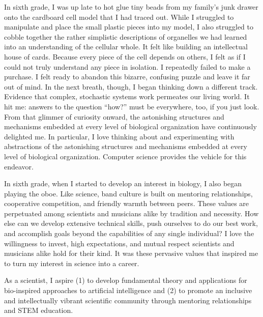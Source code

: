 In sixth grade, I was up late to hot glue tiny beads from my family's junk drawer onto the cardboard cell model that I had traced out.
While I struggled to manipulate and place the small plastic pieces into my model, I also struggled to cobble together the rather simplistic descriptions of organelles we had learned into an understanding of the cellular whole.
It felt like building an intellectual house of cards.
Because every piece of the cell depends on others, I felt as if I could not truly understand any piece in isolation.
I repeatedly failed to make a purchase.
I felt ready to abandon this bizarre, confusing puzzle and leave it far out of mind.
In the next breath, though, I began thinking down a different track.
Evidence that complex, stochastic systems work permeates our living world.
It hit me: answers to the question ``how?'' must be everywhere, too, if you just look.
From that glimmer of curiosity onward, the astonishing structures and mechanisms embedded at every level of biological organization have continuously delighted me.
In particular, I love thinking about and experimenting with abstractions of the astonishing structures and mechanisms embedded at every level of biological organization.
Computer science provides the vehicle for this endeavor.

In sixth grade, when I started to develop an interest in biology, I also began playing the oboe.
Like science, band culture is built on mentoring relationships, cooperative competition, and friendly warmth between peers.
These values are perpetuated among scientists and musicians alike by tradition and necessity.
How else can we develop extensive technical skills, push ourselves to do our best work, and accomplish goals beyond the capabilities of any single individual?
I love the willingness to invest, high expectations, and mutual respect scientists and musicians alike hold for their kind.
It was these pervasive values that inspired me to turn my interest in science into a career.

As a scientist, I aspire
(1) to develop fundamental theory and applications for bio-inspired approaches to artificial intelligence and
(2) to promote an inclusive and intellectually vibrant scientific community through mentoring relationships and STEM education.
